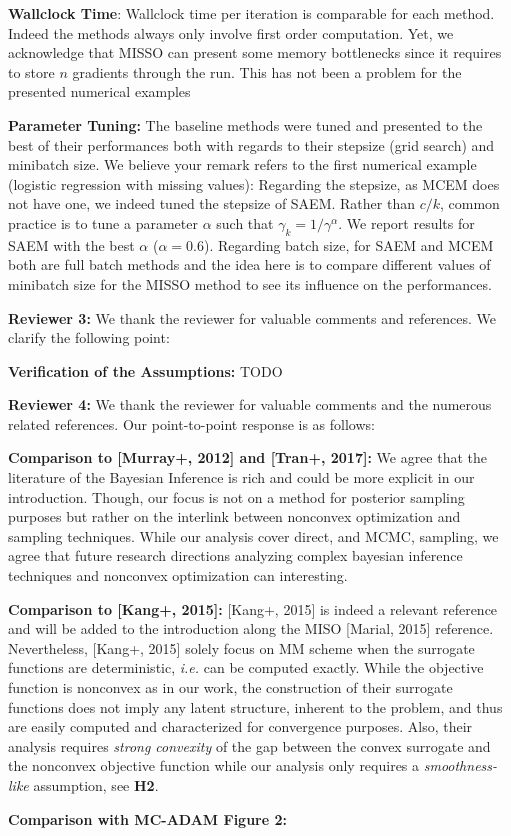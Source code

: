 \documentclass{article}
\begin{document}
\textbf{Wallclock Time}:
Wallclock time per iteration is comparable for each method. Indeed the methods always only involve first order computation. Yet, we acknowledge that MISSO can present some memory bottlenecks since it requires to store $n$ gradients through the run. This has not been a problem for the presented numerical examples

\textbf{Parameter Tuning:}
The baseline methods were tuned and presented to the best of their performances both with regards to their stepsize (grid search) and minibatch size.
We believe your remark refers to the first numerical example (logistic regression with missing values): Regarding the stepsize, as MCEM does not have one, we indeed tuned the stepsize of SAEM. Rather than $c/k$, common practice is to tune a parameter $\alpha$ such that $\gamma_k = 1/\gamma^{\alpha}$. We report results for SAEM with the best $\alpha$ ($\alpha = 0.6$). Regarding batch size, for SAEM and MCEM both are full batch methods and the idea here is to compare different values of minibatch size for the MISSO method to see its influence on the performances.



\textbf{\textcolor{yellow!80!black}{Reviewer 3:}} We thank the reviewer for valuable comments and references. We clarify the following point:

\textbf{Verification of the Assumptions:} {\color{red} TODO }



\textbf{\textcolor{green!50!black}{Reviewer 4:}} We thank the reviewer for valuable comments and the numerous related references. Our point-to-point response is as follows:

\textbf{Comparison to [Murray+, 2012] and [Tran+, 2017]:} We agree that the literature of the Bayesian Inference is rich and could be more explicit in our introduction. Though, our focus is not on a method for posterior sampling purposes but rather on the interlink between nonconvex optimization and sampling techniques. While our analysis cover direct, and MCMC, sampling, we agree that future research directions analyzing complex bayesian inference techniques and nonconvex optimization can interesting.

\textbf{Comparison to [Kang+, 2015]:} [Kang+, 2015] is indeed a relevant reference and will be added to the introduction along the MISO [Marial, 2015] reference.
Nevertheless, [Kang+, 2015] solely focus on MM scheme when the surrogate functions are deterministic, \textit{i.e.} can be computed exactly. 
While the objective function is nonconvex as in our work, the construction of their surrogate functions does not imply any latent structure, inherent to the problem, and thus are easily computed and characterized for convergence purposes. Also, their analysis requires \emph{strong convexity} of the gap between the convex surrogate and the nonconvex objective function while our analysis only requires a \emph{smoothness-like} assumption, see \textbf{H2}.

\textbf{Comparison with MC-ADAM Figure 2:}
\end{document}
